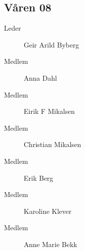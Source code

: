 {\begin{minipage}{0.6\textwidth}
\subsection*{Våren 08}

\begin{description}
	\item[Leder] Geir Arild Byberg
	\item[Medlem] Anna Dahl
	\item[Medlem] Eirik F Mikalsen
	\item[Medlem] Christian Mikalsen
	\item[Medlem] Erik Berg
	\item[Medlem] Karoline Klever
	\item[Medlem] Anne Marie Bekk
\end{description}
\end{minipage}
}
